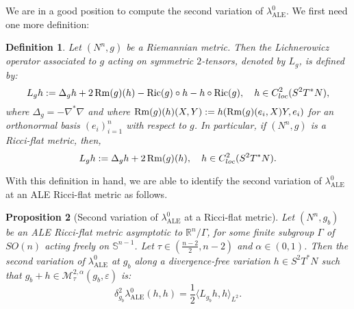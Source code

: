 \documentclass[a4paper,11pt,reqno]{amsart}
\newtheorem{defn}{Definition}[section]
\newtheorem{prop}[defn]{Proposition}
\def\RR{\mathbb{R}}
\def\Ric{\mathop{\rm Ric}\nolimits}
\def\Rm{\mathop{\rm Rm}\nolimits}
\def\Ric{\mathop{\rm Ric}\nolimits}
\def\Rm{\mathop{\rm Rm}\nolimits}
\numberwithin{equation}{section}
\begin{document}
		
	
	We are in a good position to compute the second variation of $\lambda_{\operatorname{ALE}}^0$. We first need one more definition:
	\begin{defn}\label{defn-Lic-Op}
		Let $(N^n,g)$ be a Riemannian metric. Then the \emph{Lichnerowicz operator} associated to $g$ acting on symmetric $2$-tensors, denoted by $L_{g}$, is defined by:
		\begin{equation}
		L_{g}h:=\Delta_{g}h + 2\Rm(g)(h)-\Ric(g)\circ h-h\circ\Ric(g),\quad h\in C_{loc}^2(S^2T^*N),\label{defn-Lic-op-eq}
		\end{equation}
		where $\Delta_{g}=-\nabla^*\nabla$ and where $\Rm(g)(h)(X,Y) := h(\Rm(g)(e_i,X)Y,e_i)$ for an orthonormal basis $(e_i)_{i=1}^n$ with respect to $g$. In particular, if $(N^n,g)$ is a Ricci-flat metric, then,
		\begin{equation}
		L_{g}h:=\Delta_{g}h + 2\Rm(g)(h),\quad h\in C_{loc}^2(S^2T^*N).\label{defn-Lic-op-eq}
		\end{equation}
	\end{defn}
	
	With this definition in hand, we are able to identify the second variation of $\lambda_{\operatorname{ALE}}^0$  at an ALE Ricci-flat metric as follows.
	\begin{prop}[Second variation of $\lambda_{\operatorname{ALE}}^0$ at a Ricci-flat metric]\label{second-var-prop}
		Let $(N^n,g_b)$ be an ALE Ricci-flat metric asymptotic to $\RR^n\slash\Gamma$, for some finite subgroup $\Gamma$ of $SO(n)$ acting freely on $\mathbb{S}^{n-1}$. Let $\tau\in(\frac{n-2}{2},n-2)$ and $\alpha\in(0,1)$. Then the second variation of $\lambda_{\operatorname{ALE}}^0$ at $g_b$ along a divergence-free variation $h\in S^2T^*N$ such that $g_b+h\in \mathcal{M}^{2,\alpha}_{\tau}(g_b,\varepsilon)$ is:
		\begin{equation}
		\delta^2_{g_b}\lambda_{\operatorname{ALE}}^0(h,h)=\frac{1}{2}\langle L_{g_b}h,h\rangle_{L^2}.
		\end{equation}
	
	\end{prop}
	
\end{document}

